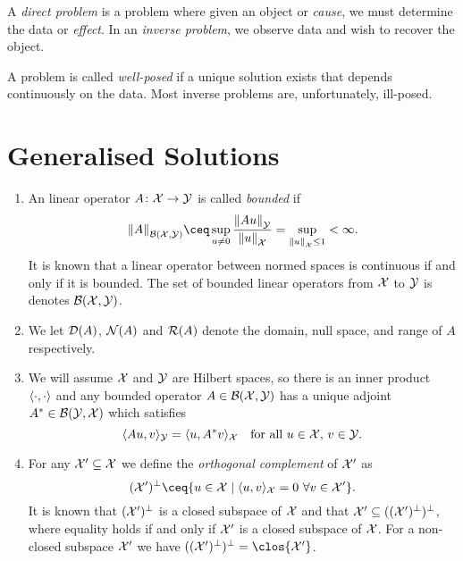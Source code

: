 \begin{mdframed}
A \emph{direct problem} is a problem where given an object or \emph{cause}, we must determine the data or \emph{effect}. In an \emph{inverse problem}, we observe data and wish to recover the object. 

A problem is called \emph{well-posed} if a unique solution exists that depends continuously on the data. Most inverse problems are, unfortunately, ill-posed. 
\end{mdframed}

\section{Generalised Solutions}
\begin{recap}
    \begin{enumerate}
        \item     An linear operator $A \colon \mathcal X \to \mathcal Y$ is called \emph{bounded} if
        \[
        \norm{A}_{\BB(\XX, \YY)} \ceq \sup_{u \neq 0} \frac{\norm{Au}_\YY}{\norm{u}_\XX} = \sup_{\norm{u}_\XX \leq 1} < \infty. 
        \]
            It is known that a linear operator between normed spaces is continuous if and only if it is bounded. The set of bounded linear operators from $\mathcal X$ to $\mathcal Y$ is denotes $\mathcal B(\mathcal X, \mathcal Y)$. 
            \item 
        We let $\operatorname{\mathcal D}(A)$, $\operatorname{\mathcal N}(A)$ and  $\operatorname{\mathcal R}(A)$ denote the domain, null space, and range of $A$ respectively. 
        
        \item     We will assume $\mathcal X$ and $\mathcal Y$ are Hilbert spaces, so there is an inner product $\langle\cdot, \cdot\rangle$ and any bounded operator $A \in \mathcal B(\mathcal X, \mathcal Y)$ has a unique adjoint $A^* \in \mathcal B(\mathcal Y, \mathcal X)$ which satisfies
        \[
        \langle Au, v\rangle_\mathcal Y = \langle u, A^* v\rangle_\mathcal X \quad\text{for all $u \in \mathcal X$, $v \in \mathcal Y$.}
        \]
        
        \item For any $\mathcal X' \subseteq \mathcal X$ we define the \emph{orthogonal complement} of $\mathcal X'$ as
        \[
        (\XX')\P \ceq \qty{u \in \XX \mid \ang{u, v}_\XX = 0 \ \forall v \in \XX'}. 
        \]
        It is known that $(\mathcal X')^\perp$ is a closed subspace of $\mathcal X$ and that $\mathcal X' \subseteq ((\mathcal X')^\perp)^\perp$, where equality holds if and only if $\mathcal X'$ is a closed subspace of $\mathcal X$. For a non-closed subspace $\mathcal X'$ we have $((\XX')\P)\P = \clos{\XX'}$. 
        

\end{enumerate}
\end{recap}
